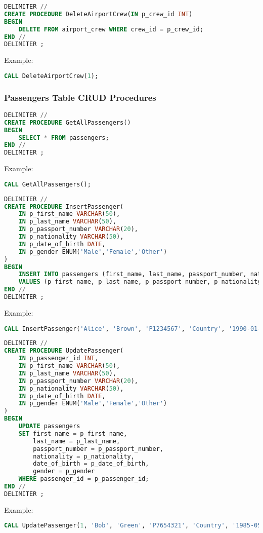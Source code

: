 \documentclass[a4paper,12pt]{article}
\begin{document}
\begin{lstlisting}[language=SQL, caption=DeleteAirportCrew Stored Procedure]
DELIMITER //
CREATE PROCEDURE DeleteAirportCrew(IN p_crew_id INT)
BEGIN
    DELETE FROM airport_crew WHERE crew_id = p_crew_id;
END //
DELIMITER ;
\end{lstlisting}
Example:
\begin{lstlisting}[language=SQL]
CALL DeleteAirportCrew(1);
\end{lstlisting}

\subsubsection{Passengers Table CRUD Procedures}

\begin{lstlisting}[language=SQL, caption=GetAllPassengers Stored Procedure]
DELIMITER //
CREATE PROCEDURE GetAllPassengers()
BEGIN
    SELECT * FROM passengers;
END //
DELIMITER ;
\end{lstlisting}
Example:
\begin{lstlisting}[language=SQL]
CALL GetAllPassengers();
\end{lstlisting}

\begin{lstlisting}[language=SQL, caption=InsertPassenger Stored Procedure]
DELIMITER //
CREATE PROCEDURE InsertPassenger(
    IN p_first_name VARCHAR(50),
    IN p_last_name VARCHAR(50),
    IN p_passport_number VARCHAR(20),
    IN p_nationality VARCHAR(50),
    IN p_date_of_birth DATE,
    IN p_gender ENUM('Male','Female','Other')
)
BEGIN
    INSERT INTO passengers (first_name, last_name, passport_number, nationality, date_of_birth, gender)
    VALUES (p_first_name, p_last_name, p_passport_number, p_nationality, p_date_of_birth, p_gender);
END //
DELIMITER ;
\end{lstlisting}
Example:
\begin{lstlisting}[language=SQL]
CALL InsertPassenger('Alice', 'Brown', 'P1234567', 'Country', '1990-01-01', 'Female');
\end{lstlisting}

\begin{lstlisting}[language=SQL, caption=UpdatePassenger Stored Procedure]
DELIMITER //
CREATE PROCEDURE UpdatePassenger(
    IN p_passenger_id INT,
    IN p_first_name VARCHAR(50),
    IN p_last_name VARCHAR(50),
    IN p_passport_number VARCHAR(20),
    IN p_nationality VARCHAR(50),
    IN p_date_of_birth DATE,
    IN p_gender ENUM('Male','Female','Other')
)
BEGIN
    UPDATE passengers
    SET first_name = p_first_name,
        last_name = p_last_name,
        passport_number = p_passport_number,
        nationality = p_nationality,
        date_of_birth = p_date_of_birth,
        gender = p_gender
    WHERE passenger_id = p_passenger_id;
END //
DELIMITER ;
\end{lstlisting}
Example:
\begin{lstlisting}[language=SQL]
CALL UpdatePassenger(1, 'Bob', 'Green', 'P7654321', 'Country', '1985-05-05', 'Male');
\end{lstlisting}
\end{document}
